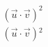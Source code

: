 \documentclass[preview]{standalone}
\begin{document}
\begin{align*}
&{\left(\vec{u} \cdot \vec{v} \right)}^2 \\ &( \vec{u} \cdot \vec{v} ){}^2 \\
\end{align*}
\end{document}
